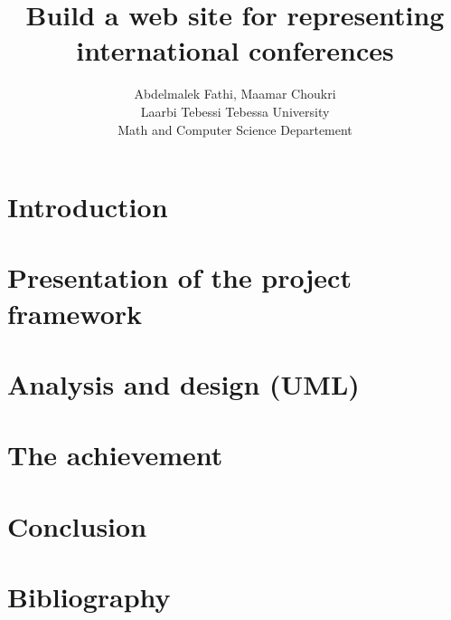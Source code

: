 \documentclass{article}
\title{Build a web site for representing international conferences}
\author{Abdelmalek Fathi, Maamar Choukri\\
Laarbi Tebessi Tebessa University\\
Math and Computer Science Departement}
\date{}
\begin{document}
	\maketitle
	\clearpage
	\tableofcontents
	\clearpage
	\section*{Introduction}
	\clearpage
	\section{Presentation of the project framework}
	\clearpage
	\section{Analysis and design (UML)}
	\clearpage
	\section{The achievement}
	\clearpage
	\section*{Conclusion}
	\clearpage
	\section*{Bibliography}
\end{document}
